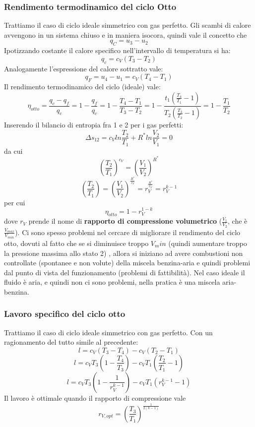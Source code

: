 \subsubsection{Rendimento termodinamico del ciclo Otto}
Trattiamo il caso di ciclo ideale simmetrico con gas perfetto.\newline
Gli scambi di calore avvengono in un sistema chiuso e in maniera isocora, quindi vale il concetto che
\[
    q_C = u_3- u_2
\]
Ipotizzando costante il calore specifico nell'intervallo di temperatura si ha:
\[
    q_c = c_V(T_3-T_2)
\]
Analogamente l'espressione del calore sottratto vale:
\[
    q_F = u_4-u_1 = c_V(T_4-T_1)
\]
Il rendimento termodinamico del ciclo (ideale) vale:
\[
    \eta_{otto} = \frac{q_c - q_f}{q_c} = 1- \frac{q_f}{q_c} = 1- \frac{T_4-T_1}{T_3-T_2} = 1- \frac{t_1 \left(\frac{T_4}{T_1}-1\right)}{T_2 \left(\frac{T_3}{T_2}-1\right)} = 1- \frac{T_1}{T_2}
\]
Inserendo il bilancio di entropia fra 1 e 2 per i gas perfetti:
\[
    \Delta s_{12} = c_V ln \frac{T_2}{T_1} + R^* ln \frac{V_2}{V_1} = 0
\]
da cui 
\[
    \left(\frac{T_2}{T_1}\right)^{c_V} = \left(\frac{V_1}{V_2}\right)^{R^*}
\]
\[
    \left(\frac{T_2}{T_1}\right) = \left(\frac{V_1}{V_2}\right)^{\frac{R^*}{c_V}} = r_V^{\frac{R^*}{c_V}} = r_V^{k-1}
\]
per cui
\[
    \eta_{otto} = 1- r_V^{1-k}
\]
dove $r_V$ prende il nome di \textbf{rapporto di compressione volumetrico} ($\frac{V_1}{V_2}$, che è $\frac{V_{max}}{V_{min}}$).\newline
\newline
Ci sono spesso problemi nel cercare di migliorare il rendimento del ciclo otto, dovuti al fatto che se si diminuisce troppo $V_min$ (quindi aumentare troppo la pressione massima allo stato 2) , allora si iniziano ad avere combustioni non controllate (spontanee e non volute) della miscela benzina-aria e quindi problemi dal punto di vista del funzionamento (problemi di fattibilità). Nel caso ideale il fluido è aria, e quindi non ci sono problemi, nella pratica è una miscela aria-benzina.
\subsubsection{Lavoro specifico del ciclo otto}
Trattiamo il caso di ciclo ideale simmetrico con gas perfetto.\newline
Con un ragionamento del tutto simile al precedente:
\[
    l = c_V(T_3-T_4) -c_V(T_2-T_1)
\]
\[
    l = c_VT_3\left(1-\frac{T_4}{T_3}\right) - c_V T_1 \left(\frac{T_2}{T_1}-1 \right)
\]
\[
    l = c_V T_3 \left(1- \frac{1}{r_V^{k-1}}\right) - c_V T_1 (r_V^{k-1} - 1)
\]
Il lavoro è ottimale quando il rapporto di compressione vale
\[
    r_{V,opt} = \left(\frac{T_3}{T_1}\right)^{\frac{1}{2(k-1)}}
\]
